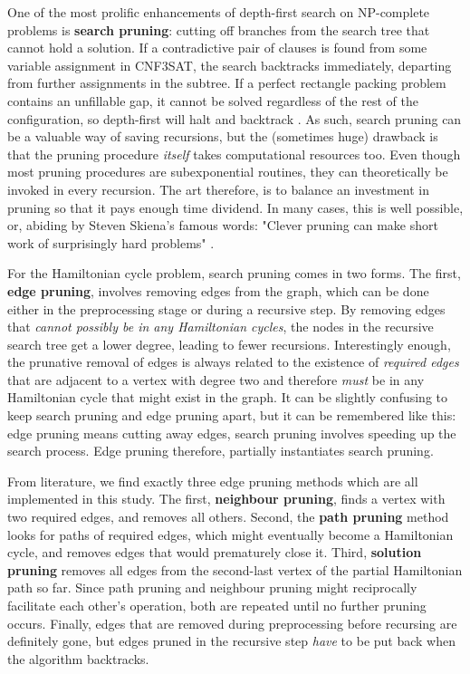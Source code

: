 \documentclass[10pt,conference,compsocconf]{IEEEtran}
\begin{document}
\noindent One of the most prolific enhancements of depth-first search on NP-complete problems is \textbf{search pruning}: cutting off branches from the search tree that cannot hold a solution. If a contradictive pair of clauses is found from some variable assignment in CNF3SAT, the search backtracks immediately, departing from further assignments in the subtree. If a perfect rectangle packing problem contains an unfillable gap, it cannot be solved regardless of the rest of the configuration, so depth-first will halt and backtrack \cite{van2016almost}. As such, search pruning can be a valuable way of saving recursions, but the (sometimes huge) drawback is that the pruning procedure \textit{itself} takes computational resources too. Even though most pruning procedures are subexponential routines, they can theoretically be invoked in every recursion. The art therefore, is to balance an investment in pruning so that it pays enough time dividend. In many cases, this is well possible, or, abiding by Steven Skiena's famous words: "Clever pruning can make short work of surprisingly hard problems" \cite{skiena1998algorithm}. 

For the Hamiltonian cycle problem, search pruning comes in two forms. The first, \textbf{edge pruning}, involves removing edges from the graph, which can be done either in the preprocessing stage or during a recursive step. By removing edges that \textit{cannot possibly be in any Hamiltonian cycles}, the nodes in the recursive search tree get a lower degree, leading to fewer recursions. Interestingly enough, the prunative removal of edges is always related to the existence of \textit{required edges} that are adjacent to a vertex with degree two and therefore \textit{must} be in any Hamiltonian cycle that might exist in the graph. It can be slightly confusing to keep search pruning and edge pruning apart, but it can be remembered like this: edge pruning means cutting away edges, search pruning involves speeding up the search process. Edge pruning therefore, partially instantiates search pruning.

From literature, we find exactly three edge pruning methods which are all implemented in this study. The first, \textbf{neighbour pruning}, finds a vertex with two required edges, and removes all others. Second, the \textbf{path pruning} method looks for paths of required edges, which might eventually become a Hamiltonian cycle, and removes edges that would prematurely close it. Third, \textbf{solution pruning} removes all edges from the second-last vertex of the partial Hamiltonian path so far. Since path pruning and neighbour pruning might reciprocally facilitate each other's operation, both are repeated until no further pruning occurs. Finally, edges that are removed during preprocessing before recursing are definitely gone, but edges pruned in the recursive step \textit{have} to be put back when the algorithm backtracks.
\end{document}
